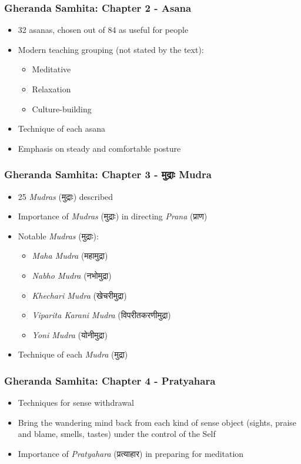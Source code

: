 \begin{frame}[fragile]\frametitle{Gheranda Samhita: Chapter 2 - Asana}
\begin{itemize}
    \item 32 asanas, chosen out of 84 as useful for people
    \item Modern teaching grouping (not stated by the text):
    \begin{itemize}
        \item Meditative
        \item Relaxation
        \item Culture-building
    \end{itemize}
    \item Technique of each asana
    \item Emphasis on steady and comfortable posture
\end{itemize}
\end{frame}

\begin{frame}[fragile]\frametitle{Gheranda Samhita: Chapter 3 - मुद्राः Mudra}
\begin{itemize}
    \item 25 \textit{Mudras} (मुद्राः) described
    \item Importance of \textit{Mudras} (मुद्राः) in directing \textit{Prana} (प्राण)
    \item Notable \textit{Mudras} (मुद्राः):
    \begin{itemize}
        \item \textit{Maha Mudra} (महामुद्रा)
        \item \textit{Nabho Mudra} (नभोमुद्रा)
        \item \textit{Khechari Mudra} (खेचरीमुद्रा)
        \item \textit{Viparita Karani Mudra} (विपरीतकरणीमुद्रा)
        \item \textit{Yoni Mudra} (योनीमुद्रा)
    \end{itemize}
    \item Technique of each \textit{Mudra} (मुद्रा)
\end{itemize}
\end{frame}

\begin{frame}[fragile]\frametitle{Gheranda Samhita: Chapter 4 - Pratyahara}
\begin{itemize}
    \item Techniques for sense withdrawal
    \item Bring the wandering mind back from each kind of sense object (sights, praise and blame, smells, tastes) under the control of the Self
    \item Importance of \textit{Pratyahara} (प्रत्याहार) in preparing for meditation
\end{itemize}
\end{frame}



